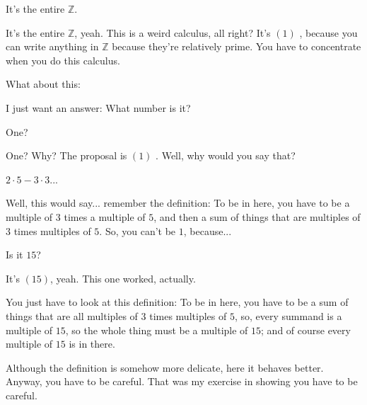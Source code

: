 \begin{student}
It's the entire $\mathbb{Z}$.
\end{student}

\begin{speech}[01:14:52 - 01:15:31]
It's the entire $\mathbb{Z}$, yeah. This is a weird calculus, all right? It's $(1)$ , because you can write anything in $\mathbb{Z}$ because they're relatively prime. You have to concentrate when you do this calculus.

What about this: 

I just want an answer: What number is it? 
\end{speech}

\begin{student}
One?
\end{student}

\begin{speech}[01:15:33 - 01:15:40]
One? Why? The proposal is $(1)$ . Well, why would you say that?
\end{speech}

\begin{student}
$2 \cdot 5 - 3 \cdot 3$...
\end{student}

\begin{speech}[01:15:45 - 01:16:00]
Well, this would say... remember the definition: To be in here, you have to be a multiple of $3$ times a multiple of $5$, and then a sum of things that are multiples of $3$ times multiples of $5$. So, you can't be $1$, because...
\end{speech}

\begin{student}
Is it $15$?
\end{student}

\begin{speech}[01:16:02 - 01:16:29]
It's $(15)$, yeah. This one worked, actually. 

You just have to look at this definition: To be in here, you have to be a sum of things that are all multiples of $3$ times multiples of $5$, so, every summand is a multiple of $15$, so the whole thing must be a multiple of $15$; and of course every multiple of $15$ is in there.

Although the definition is somehow more delicate, here it behaves better. Anyway, you have to be careful. That was my exercise in showing you have to be careful.
\end{speech}

